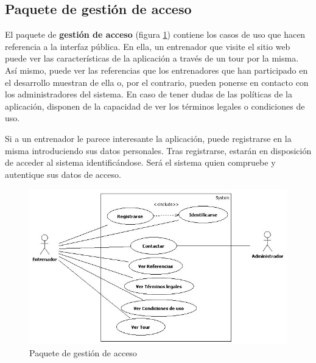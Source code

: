 	
	\subsection{Paquete de gestión de acceso} %
		\label{sub:paquete_de_gestion_de_acceso}
		
		El paquete de {\bf gestión de acceso} (figura \ref{fig:analisis_gestion_acceso}) contiene los casos de uso que hacen referencia a la interfaz pública. En ella, un entrenador que visite el sitio web puede ver las características de la aplicación a través de un tour por la misma. Así mismo, puede ver las referencias que los entrenadores que han participado en el desarrollo muestran de ella o, por el contrario, pueden ponerse en contacto con los administradores del sistema. En caso de tener dudas de las políticas de la aplicación, disponen de la capacidad de ver los términos legales o condiciones de uso.
		
		Si a un entrenador le parece interesante la aplicación, puede registrarse en la misma introduciendo sus datos personales. Tras registrarse, estarán en disposición de acceder al sistema identificándose. Será el sistema quien compruebe y autentique sus datos de acceso.		
		
		\begin{figure}[H]
		  \centering
		    \includegraphics[width=15cm]{./eps/casos_uso/gestion_acceso.eps}
		  \caption{Paquete de gestión de acceso}
		  \label{fig:analisis_gestion_acceso}
		\end{figure}
		
	

